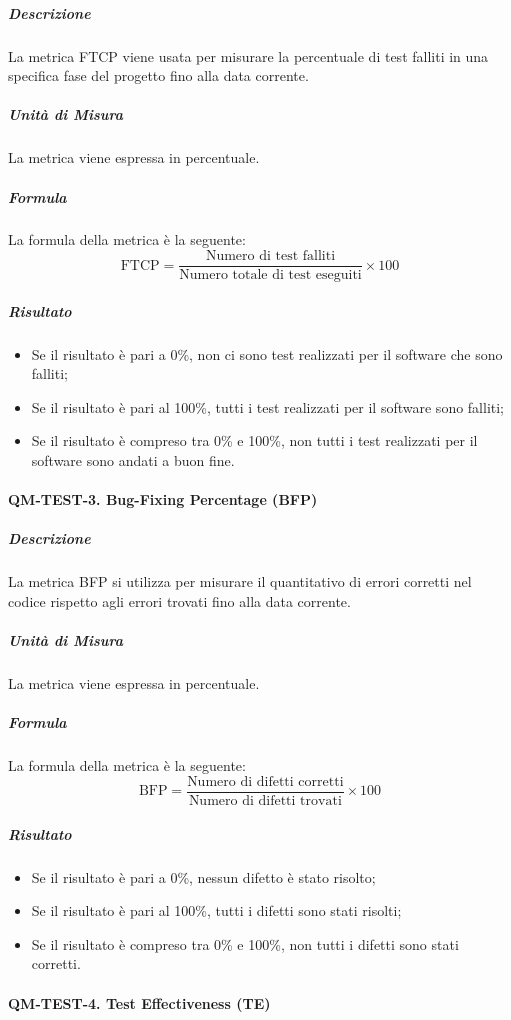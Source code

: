 				\subparagraph{Descrizione}
				La metrica FTCP viene usata per misurare la percentuale di test falliti in una specifica fase del progetto fino alla data corrente.

				\subparagraph{Unità di Misura}
				La metrica viene espressa in percentuale.

				\subparagraph{Formula}
				La formula della metrica è la seguente:
				\[
					\text{FTCP} = \frac{\text{Numero di test falliti}}{\text{Numero totale di test eseguiti}} \times 100
				\]

				\subparagraph{Risultato}
				\begin{itemize}
					\item Se il risultato è pari a 0\%, non ci sono test realizzati per il software che sono falliti;
					\item Se il risultato è pari al 100\%, tutti i test realizzati per il software sono falliti;
					\item Se il risultato è compreso tra 0\% e 100\%, non tutti i test realizzati per il software sono andati a buon fine.
				\end{itemize}

			\paragraph{QM-TEST-3. Bug-Fixing Percentage (BFP)}

				\subparagraph{Descrizione}
				La metrica BFP si utilizza per misurare il quantitativo di errori corretti nel codice rispetto agli errori trovati fino alla data corrente.

				\subparagraph{Unità di Misura}
				La metrica viene espressa in percentuale.

				\subparagraph{Formula}
				La formula della metrica è la seguente:
				\[
					\text{BFP} = \frac{\text{Numero di difetti corretti}}{\text{Numero di difetti trovati}} \times 100
				\]

				\subparagraph{Risultato}
				\begin{itemize}
					\item Se il risultato è pari a 0\%, nessun difetto è stato risolto;
					\item Se il risultato è pari al 100\%, tutti i difetti sono stati risolti;
					\item Se il risultato è compreso tra 0\% e 100\%, non tutti i difetti sono stati corretti.
				\end{itemize}

			\paragraph{QM-TEST-4. Test Effectiveness (TE)}

